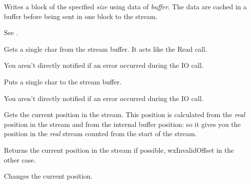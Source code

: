 
Writes a block of the specified {\it size} using data of {\it buffer}. The data
are cached in a buffer before being sent in one block to the stream.


See .

\label{wxstreambuffergetchar}


Gets a single char from the stream buffer. It acts like the Read call.


You aren't directly notified if an error occurred during the IO call.



\label{wxstreambufferputchar}


Puts a single char to the stream buffer.


You aren't directly notified if an error occurred during the IO call.



\label{wxstreambuffertell}


Gets the current position in the stream. This position is calculated from
the {\it real} position in the stream and from the internal buffer position: so
it gives you the position in the {\it real} stream counted from the start of
the stream.


Returns the current position in the stream if possible, wxInvalidOffset in the
other case.

\label{wxstreambufferseek}


Changes the current position.

